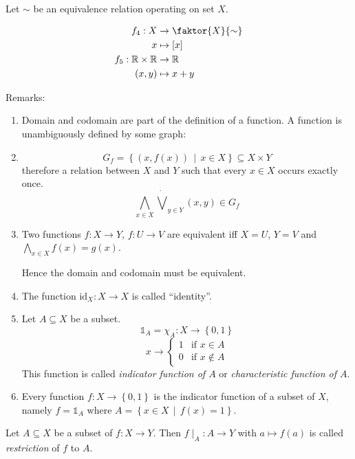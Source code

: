 \documentclass[a4paper,landscape,twocolumn]{article}
\newcommand\set[1]{\left\{#1\right\}}
\newcommand\setdef[2]{\left\{#1\,\middle|\,#2\right\}}
\begin{document}
Let $\sim$ be an equivalence relation operating on set $X$.

\begin{align*}
  f_4: X &\rightarrow \faktor{X}{\sim} \\
       x &\mapsto [x] \\
  f_5: \mathbb{R} \times \mathbb{R} &\rightarrow \mathbb{R} \\
       (x,y) &\mapsto x+y
\end{align*}

Remarks:
\begin{enumerate}
  \item
    Domain and codomain are part of the definition of a function.
    A function is unambiguously defined by some graph:

  \item
    \[ G_f = \setdef{(x, f(x))}{x \in X} \subseteq X \times Y \]
    therefore a relation between $X$ and $Y$ such that every $x \in X$
    occurs exactly once.
    \[ \bigwedge_{x\in X} \dot\bigvee_{y\in Y} (x,y) \in G_f \]

  \item
    Two functions $f: X \rightarrow Y$, $f: U \rightarrow V$ are
    equivalent iff $X = U$, $Y = V$ and $\bigwedge_{x \in X} f(x) = g(x)$.

    Hence the domain and codomain must be equivalent.

  \item
    The function $\text{id}_X: X \rightarrow X$ is called \enquote{identity}.

  \item
    Let $A \subseteq X$ be a subset.
    \[ \mathbb{1}_A = \chi_A: X \rightarrow \set{0,1} \]
    \[
       x \rightarrow \begin{cases}
         1 & \text{if } x \in A \\
         0 & \text{if } x \notin A
       \end{cases}
    \]
    This function is called \emph{indicator function of $A$}
    or \emph{characteristic function of $A$}.

  \item
    Every function $f: X \rightarrow \set{0,1}$ is the indicator
    function of a subset of $X$, namely $f = \mathbb{1}_A$
    where $A = \setdef{x \in X}{f(x) = 1}$.
\end{enumerate}

Let $A \subseteq X$ be a subset of $f: X \rightarrow Y$.
Then $f\mid_A: A \rightarrow Y$ with $a \mapsto f(a)$ is
called \emph{restriction} of $f$ to $A$.
\end{document}
